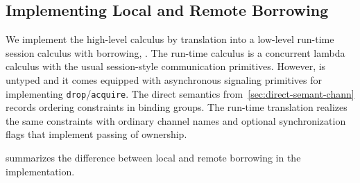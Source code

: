 \subsection{Implementing Local and Remote Borrowing}
\label{sec:impl-local-remote}

We implement the high-level calculus by translation into
a low-level run-time session calculus with borrowing, \thertcalculus. The run-time calculus
is a concurrent 
lambda calculus with the usual session-style communication
primitives. However, \thertcalculus is untyped and it comes equipped with
asynchronous signaling primitives for implementing \lstinline{drop}/\lstinline{acquire}.
The direct semantics from~\cref{sec:direct-semant-chann} records ordering constraints in binding
groups. The run-time translation realizes the same constraints with
ordinary channel names and optional synchronization flags that
implement passing of ownership.

 summarizes the difference between local
and remote borrowing in the implementation.

